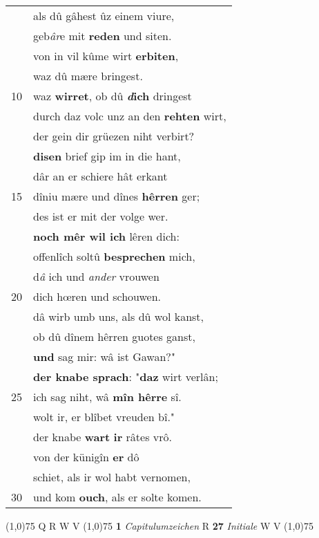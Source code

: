 \documentclass[8pt,a4paper,notitlepage]{article}
\begin{document}
\begin{table}[ht]
\begin{minipage}[t]{0.5\linewidth}
\begin{tabular}{rl}
 & als dû gâhest ûz einem viure,\\ 
 & geb\textit{âr}e mit \textbf{reden} und siten.\\ 
 & von in vil kûme wirt \textbf{erbiten},\\ 
 & waz dû mære bringest.\\ 
10 & waz \textbf{wirret}, ob dû \textbf{\textit{d}ich} dringest\\ 
 & durch daz volc unz an den \textbf{rehten} wirt,\\ 
 & der gein dir grüezen niht verbirt?\\ 
 & \textbf{disen} brief gip im in die hant,\\ 
 & dâr an er schiere hât erkant\\ 
15 & dîniu mære und dînes \textbf{hêrren} ger;\\ 
 & des ist er mit der volge wer.\\ 
 & \textbf{noch mêr wil ich} lêren dich:\\ 
 & offenlîch soltû \textbf{besprechen} mich,\\ 
 & d\textit{â} ich und \textit{ander} vrouwen\\ 
20 & dich hœren und schouwen.\\ 
 & dâ wirb umb uns, als dû wol kanst,\\ 
 & ob dû dînem hêrren guotes ganst,\\ 
 & \textbf{und} sag mir: wâ ist Gawan?"\\ 
 & \textbf{der knabe sprach}: "\textbf{daz} wirt verlân;\\ 
25 & ich sag niht, wâ \textbf{mîn hêrre} sî.\\ 
 & wolt ir, er blîbet vreuden bî."\\ 
 & der knabe \textbf{wart} \textbf{ir} râtes vrô.\\ 
 & von der künigîn \textbf{er} dô\\ 
 & schiet, als ir wol habt vernomen,\\ 
30 & und kom \textbf{ouch}, als er solte komen.\\ 
\end{tabular}
\scriptsize
\line(1,0){75} \newline
Q R W V \newline
\line(1,0){75} \newline
\textbf{1} \textit{Capitulumzeichen} R  \textbf{27} \textit{Initiale} W V  \newline
\line(1,0){75} \newline

\end{minipage}
\end{table}
\end{document}
